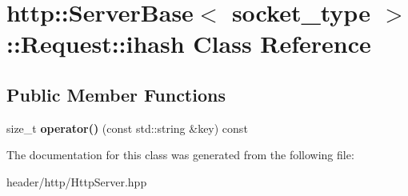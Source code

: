 \hypertarget{classhttp_1_1_server_base_1_1_request_1_1ihash}{}\section{http\+:\+:Server\+Base$<$ socket\+\_\+type $>$\+:\+:Request\+:\+:ihash Class Reference}
\label{classhttp_1_1_server_base_1_1_request_1_1ihash}
\subsection*{Public Member Functions}
\begin{DoxyCompactItemize}
\item 
\mbox{\label{classhttp_1_1_server_base_1_1_request_1_1ihash_afdb9199e93314c528b6c7cd9a8186228}} 
size\+\_\+t {\bfseries operator()} (const std\+::string \&key) const
\end{DoxyCompactItemize}


The documentation for this class was generated from the following file\+:\begin{DoxyCompactItemize}
\item 
header/http/Http\+Server.\+hpp\end{DoxyCompactItemize}
